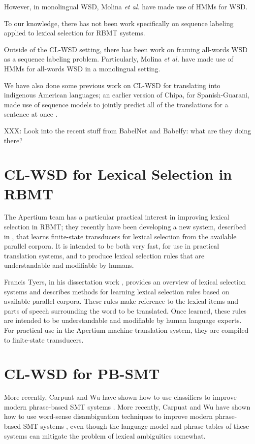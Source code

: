 However, in monolingual WSD, Molina \textit{et al.}
\cite{DBLP:conf/iberamia/MolinaPS02} have made use of HMMs for WSD. 

To our knowledge, there has not been work specifically on sequence labeling
applied to lexical selection for RBMT systems.

Outside of the CL-WSD setting, there has been work on framing all-words WSD as
a sequence labeling problem. Particularly, Molina \textit{et al.}
\cite{DBLP:conf/iberamia/MolinaPS02} have made use of HMMs for all-words
WSD in a monolingual setting.

We have also done some previous work on CL-WSD for translating into indigenous
American languages; an earlier version of Chipa, for Spanish-Guarani, made use
of sequence models to jointly predict all of the translations for a sentence at
once \cite{rudnick-gasser:2013:HyTra}.

XXX:
Look into the recent stuff from BabelNet and Babelfy: what are they doing
there?


\section{CL-WSD for Lexical Selection in RBMT}

The Apertium team has a particular practical interest in improving lexical
selection in RBMT; they recently have been developing
a new system, described in \cite{tyers-fst}, that learns finite-state
transducers for lexical selection from the available parallel corpora. It is
intended to be both very fast, for use in practical translation systems, and
to produce lexical selection rules that are understandable and modifiable by
humans.

Francis Tyers, in his dissertation work \cite{tyers-dissertation},
provides an overview of lexical selection systems and describes methods for
learning lexical selection rules based on available parallel corpora.
These rules make reference to the lexical items and parts of speech surrounding
the word to be translated. Once learned, these rules are intended to be
understandable and modifiable by human language experts. For practical use in
the Apertium machine translation system, they are compiled to finite-state
transducers.


\section{CL-WSD for PB-SMT}

More recently, Carpuat and Wu have
shown how to use classifiers to improve modern phrase-based SMT systems
\cite{carpuatpsd}.
More recently, Carpuat and Wu have
shown how to use word-sense disambiguation techniques to improve modern
phrase-based SMT systems \cite{carpuatpsd}, even though the language model and
phrase tables of these systems can mitigate the problem of lexical ambiguities
somewhat.

